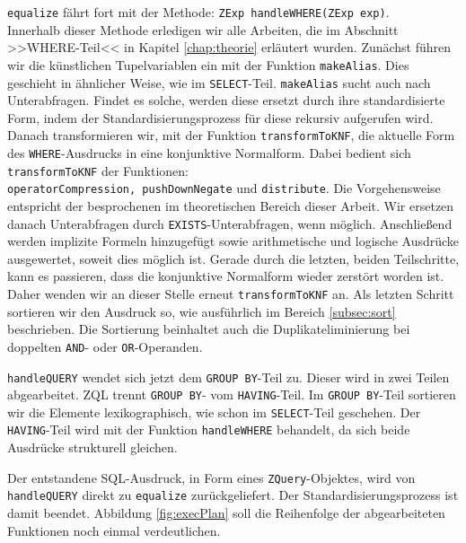 \verb|equalize| fährt fort mit der Methode: \verb|ZExp handleWHERE(ZExp exp)|.\\
Innerhalb dieser Methode erledigen wir alle Arbeiten, die im Abschnitt >>WHERE-Teil<< in Kapitel \ref{chap:theorie} erläutert wurden. Zunächst führen wir die künstlichen Tupelvariablen ein mit der Funktion \verb|makeAlias|. Dies geschieht in ähnlicher Weise, wie im \verb|SELECT|-Teil. \verb|makeAlias| sucht auch nach Unterabfragen. Findet es solche, werden diese ersetzt durch ihre standardisierte Form, indem der Standardisierungsprozess für diese rekursiv aufgerufen wird. Danach transformieren wir, mit der Funktion \verb|transformToKNF|, die aktuelle Form des \verb|WHERE|-Ausdrucks in eine konjunktive Normalform. Dabei bedient sich \verb|transformToKNF| der Funktionen:\\
\verb|operatorCompression, pushDownNegate| und \verb|distribute|. Die Vorgehensweise entspricht der besprochenen im theoretischen Bereich dieser Arbeit. Wir ersetzen danach Unterabfragen durch \verb|EXISTS|-Unterabfragen, wenn möglich. Anschließend werden implizite Formeln hinzugefügt sowie arithmetische und logische Ausdrücke ausgewertet, soweit dies möglich ist. Gerade durch die letzten, beiden Teilschritte, kann es passieren, dass die konjunktive Normalform wieder zerstört worden ist. Daher wenden wir an dieser Stelle erneut \verb|transformToKNF| an. Als letzten Schritt sortieren wir den Ausdruck so, wie ausführlich im Bereich \ref{subsec:sort} beschrieben. Die Sortierung beinhaltet auch die Duplikateliminierung bei doppelten \verb|AND|- oder \verb|OR|-Operanden.

\verb|handleQUERY| wendet sich jetzt dem \verb|GROUP BY|-Teil zu. Dieser wird in zwei Teilen abgearbeitet. ZQL trennt \verb|GROUP BY|- vom \verb|HAVING|-Teil. Im \verb|GROUP BY|-Teil sortieren wir die Elemente lexikographisch, wie schon im \verb|SELECT|-Teil geschehen. Der \verb|HAVING|-Teil wird mit der Funktion \verb|handleWHERE| behandelt, da sich beide Ausdrücke strukturell gleichen.

Der entstandene SQL-Ausdruck, in Form eines \verb|ZQuery|-Objektes, wird von \verb|handleQUERY| direkt zu \verb|equalize| zurückgeliefert. Der Standardisierungsprozess ist damit beendet. Abbildung \ref{fig:execPlan} soll die Reihenfolge der abgearbeiteten Funktionen noch einmal verdeutlichen. 


